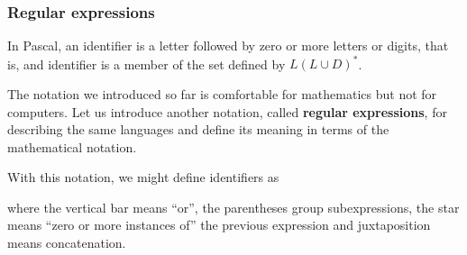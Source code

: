 
%
\begin{frame}
\frametitle{Regular expressions}

In Pascal, an identifier is a letter followed by zero or more letters
or digits, that is, and identifier is a member of the set defined
by \(L(L \cup D)^{*}\).

\bigskip

The notation we introduced so far is comfortable for mathematics but
not for computers. Let us introduce another notation,
called \textbf{regular expressions}, for describing the same languages
and define its meaning in terms of the mathematical notation.

\bigskip

With this notation, we might define \Pascal identifiers as
\begin{center}
 \lparen{} \disj {}\rparen\kleene
\end{center}
where the vertical bar means ``or'', the parentheses group
subexpressions, the star means ``zero or more instances of'' the
previous expression and juxtaposition means concatenation.

\end{frame}

